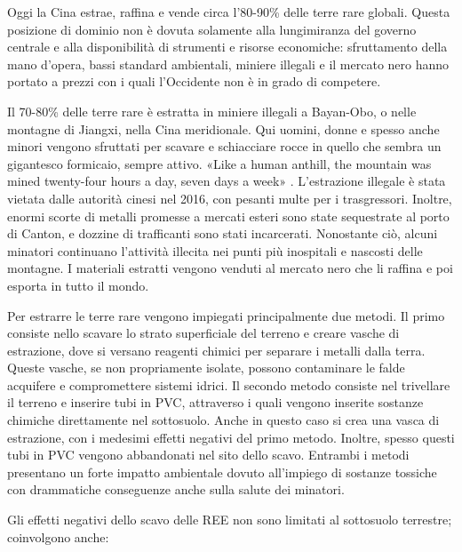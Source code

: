 \documentclass[12pt,a4paper,oneside]{book}
\begin{document}
Oggi la Cina estrae, raffina e vende circa l'80-90\% delle terre rare globali. Questa posizione di dominio non è dovuta solamente alla lungimiranza del governo centrale e alla disponibilità di strumenti e risorse economiche: sfruttamento della mano d'opera, bassi standard ambientali, miniere illegali e il mercato nero hanno portato a prezzi con i quali l'Occidente non è in grado di competere. 

Il 70-80\% delle terre rare è estratta in miniere illegali a Bayan-Obo, o nelle montagne di Jiangxi, nella Cina meridionale. Qui uomini, donne e spesso anche minori vengono sfruttati per scavare e schiacciare rocce in quello che sembra un gigantesco formicaio, sempre attivo. «Like a human anthill, the mountain was mined twenty-four hours a day, seven days a week» \citep[p. 24]{pitron2020rare}.
L'estrazione illegale è stata vietata dalle autorità cinesi nel 2016, con pesanti multe per i trasgressori. Inoltre, enormi scorte di metalli promesse a mercati esteri sono state sequestrate al porto di Canton, e dozzine di trafficanti sono stati incarcerati.
Nonostante ciò, alcuni minatori continuano l'attività illecita nei punti più inospitali e nascosti delle montagne. I materiali estratti vengono venduti al mercato nero che li raffina e poi esporta in tutto il mondo.

Per estrarre le terre rare vengono impiegati principalmente due metodi. Il primo consiste nello scavare lo strato superficiale del terreno e creare vasche di estrazione, dove si versano reagenti chimici per separare i metalli dalla terra. Queste vasche, se non propriamente isolate, possono contaminare le falde acquifere e compromettere sistemi idrici.
Il secondo metodo consiste nel trivellare il terreno e inserire tubi in PVC, attraverso i quali vengono inserite sostanze chimiche direttamente nel sottosuolo. Anche in questo caso si crea una vasca di estrazione, con i medesimi effetti negativi del primo metodo. Inoltre, spesso questi tubi in PVC vengono abbandonati nel sito dello scavo. Entrambi i metodi presentano un forte impatto ambientale dovuto all'impiego di sostanze tossiche con drammatiche conseguenze anche sulla salute dei minatori.

Gli effetti negativi dello scavo delle REE non sono limitati al sottosuolo terrestre; coinvolgono anche:
\end{document}
